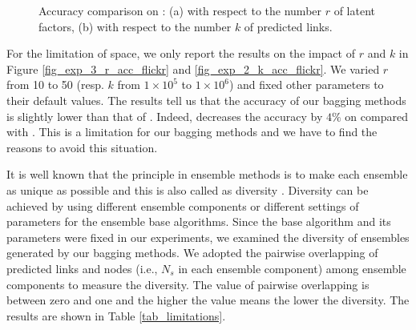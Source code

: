 \begin{figure}[tb!]
  \centering
  \vspace{1ex}
  \hspace{-2ex}
  \vspace{-2ex}
  \caption{Accuracy comparison on \Flickr: (a) with respect to the number $r$ of latent factors, 
  (b) with respect to the number $k$ of predicted links.}\label{fig_exp_5}
  \vspace{-3ex}
\end{figure}

For the limitation of space, we only report the results on the impact of $r$ and $k$
in Figure \ref{fig_exp_3_r_acc_flickr} and \ref{fig_exp_2_k_acc_flickr}.
We varied $r$ from 10 to 50 (resp. $k$ from $1\times 10^5$ to $1\times 10^6$)
and fixed other parameters to their default values. The results tell us that
the accuracy of our bagging methods is slightly lower than that of \NMF.
Indeed, \Biased decreases the accuracy by $4\%$ on \Flickr compared with \NMF.
This is a limitation for our bagging methods and we have to find
the reasons to avoid this situation.


It is well known that the principle in ensemble methods is to make each ensemble as
unique as possible and this is also called as diversity \cite{zhzhou}. Diversity can
be achieved by using different ensemble components or different settings of parameters for the ensemble base
algorithms. Since the base algorithm and its parameters were fixed in our experiments, we examined  
the diversity of ensembles generated by our bagging methods. We adopted the pairwise
overlapping of predicted links and nodes (i.e., $N_s$ in each ensemble component)
among ensemble components to measure the diversity. The value of pairwise overlapping is between
zero and one and the higher the value means the lower the diversity.
The results are shown in Table \ref{tab_limitations}.

